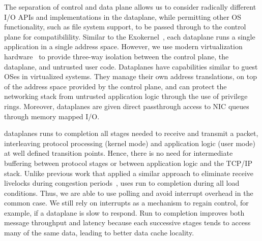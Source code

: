 The separation of control and data plane allows us to consider
radically different I/O APIs and implementations in the dataplane,
while permitting other OS functionality, such as file system support,
to be passed through to the control plane for compatibilility.
Similar to the Exokernel~\cite{DBLP:conf/sosp/EnglerKO95}, each
dataplane runs a single application in a single address
space. However, we use modern virtualization hardware~\cite{dune} to
provide three-way isolation between the control plane, the dataplane,
and untrusted user code. Dataplanes have capabilities similar to guest
OSes in virtualized systems. They manage their own address
translations, on top of the address space provided by the control
plane, and can protect the networking stack from untrusted application
logic through the use of privilege rings. Moreover, dataplanes are
given direct passthrough access to NIC queues through memory mapped
I/O.



 \ix dataplanes
runs to completion all stages needed to receive and transmit a packet,
interleaving protocol processing (kernel mode) and application logic
(user mode) at well defined transition points. Hence, there is no need
for intermediate buffering between protocol stages or between
application logic and the TCP/IP stack.  Unlike previous work that
applied a similar approach to eliminate receive livelocks during
congestion periods~\cite{receive-livelock}, \ix uses run to completion
during all load conditions. Thus, we are able to use polling and avoid
interrupt overhead in the common case. We still rely on interrupts as
a mechanism to regain control, for example, if a dataplane is slow to
respond.  Run to completion improves both message throughput and
latency because each successive stages tends to access many of the
same data, leading to better data cache locality.

